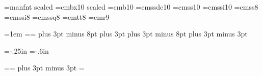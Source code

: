 
\eject %

\font\man=manfnt scaled  %
\font\CompJtitle=cmbx10 scaled %
\font\CompJabstract=cmb10 %
\font\tenssb=cmssdc10 %
\font\tenss=cmss10 %
\font\tenssi=cmssi10 %
\font\eightss=cmss8 %
\font\eightssi=cmssi8 %
\font\eightssb=cmssq8 %
\font\eighttt=cmtt8 %
\font\ninerm=cmr9 %
\let\mc=\ninerm %

\newdimen\pagewidth \newdimen\pageheight \newdimen{}
\hsize=177mm  \vsize=249mm
\parindent=1em %
\pagewidth=\hsize \pageheight=\vsize {}
\abovedisplayskip=11pt plus 3pt minus 8pt
\abovedisplayshortskip=0pt plus 3pt
\belowdisplayskip=11pt plus 3pt minus 8pt
\belowdisplayshortskip=6pt plus 3pt minus 3pt

\newif\iftitle
\def\titlepage{\global\titletrue} %

\def\leftheadline{\hbox to \pagewidth{%
    \vbox to 8pt{}\hss \eightrm D. E. KNUTH\hss}}
\def\rightheadline{\hbox to \pagewidth{%
    \vbox to 8pt{}\hss \eightrm LITERATE PROGRAMMING\hss}}
\hoffset=-.25in \voffset=-.6in

\newinsert\lefttop \newinsert\righttop
\count{} \count{}
\dimen\lefttop=\maxdimen \dimen\righttop=\maxdimen
\skip\lefttop=25pt plus 3pt minus 3pt
\skip\righttop=\skip\lefttop
\def\leftfloat{\insert\lefttop\bgroup
  \floatingpenalty=0
  \penalty0
  \vbox\bgroup}
\def\rightfloat{\insert\righttop\bgroup
  \floatingpenalty=0
  \penalty0
  \vbox\bgroup}
\def\endfloat{\egroup\egroup}

\def\onepageout#1{\shipout\vbox{ %
    \offinterlineskip %
    \vbox to 9mm{ %
      \iftitle %
        \global\titlefalse %
        \hbox to\pagewidth{\leaders\CJrule\hfill}
      \else\ifodd\pageno \rightheadline\else\leftheadline\fi\fi
      \vfill} %
    \vbox to \pageheight{
      #1 %
      \boxmaxdepth=\maxdepth
      } %
    \baselineskip=7mm \lineskiplimit=0pt
    \hbox to\pagewidth{%
      \ifodd\pageno\hfil\tenss submitted to THE COMPUTER JOURNAL%
        \tenssb\quad\folio
      \else\tenssb\folio\quad
        \tenss submitted to THE COMPUTER JOURNAL\hfil\fi}
    }
  \advancepageno}

